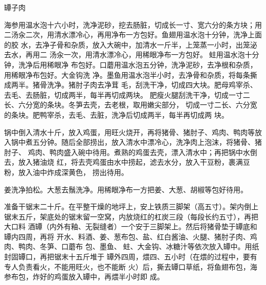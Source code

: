 \begin{recipe}{罈子肉}

\ingredients


\preparation

\step 海参用温水泡十六小时，洗净泥砂，挖去肠脏，切成长一寸、宽六分的条方块；用
二汤汆二次，用清水漂冷心，再用净布一方包好。鱼翅用温水泡十分钟，洗净上面的胶
水，去净子骨和杂质，放入大碗中，加清水一斤半，上笼蒸一小时，出笼泌去水，再用二
汤汆一次，用清水漂冷心，用稀眼净布一方包好。𧎼蛀用温水泡十分钟，洗净后用稀眼净
布包好。口蘑用温水泡五分钟，洗净泥砂，去净根和杂质，用稀眼净布包好。大金钩洗
净。墨鱼用温水泡半小时，去净骨和杂质，将每条撕成两半。猪骨洗净。猪肘子肉去净茸
毛，刮洗干净，切成四大块。肥母鸡宰杀、去毛、去肠脏，切成两半，每半再切成两块。
肥瘦火腿刮洗干净，切成一寸二长、六分宽的条块。冬笋去壳，去老根，取用嫩尖部分，
切成一寸二长、六分宽的条块。肥鸭宰杀，去毛、去脏，洗净后切成两半，每半再切成两
块。

\step 锅中倒入清水十斤，放入鸡蛋，用旺火烧开，再将猪骨、猪肘子、鸡肉、鸭肉等放
入锅中煮五分钟。随后全部捞出，放入清水中漂冷心，洗净肉上泡沫，将猪骨、猪肘子、
鸡肉、鸭肉盛入碗中待用。煮熟的鸡蛋去壳，漂入清水中；再把锅中水倒去，放入猪油烧
红，将去壳鸡蛋由水中捞起，滤去水分，放入干豆粉，裹满豆粉，放入油中炸成深黄色，
捞出待用。

\step 姜洗净拍松。大葱去鬚洗净。用稀眼净布一方把姜、大葱、胡椒等包好待用。

\step 准备干锯末二十斤。在平整干燥的地坪上，安上铁质三脚架（高五寸）。架内倒上
锯末五斤，架底处的锯末留一空窝，内放烧红的杠炭三段（每段长约五寸），再把大口料
酒罈（内外有釉、无裂缝者）一个安于三脚架上。然后将猪骨垫于罈底和罈内四周，再将
开水、料酒、姜、葱布包、盐、红白酱油、火腿、猪肘子肉、鸡肉、鸭肉、冬笋、口蘑布
包、墨鱼、𧎼蛀、大金钩、冰糖汁等依次放入罈中。用纸封固罈口，再把锯末十五斤堆于
罈外四周，煨四、五小时（在煨的过程中，要有专人负责看火，不能用旺火，也不能断
火）后，撕去罈口草纸，将鱼翅布包，海参布包，炸好的鸡蛋放入罈中，再煨半小时即
成。


\end{recipe}

